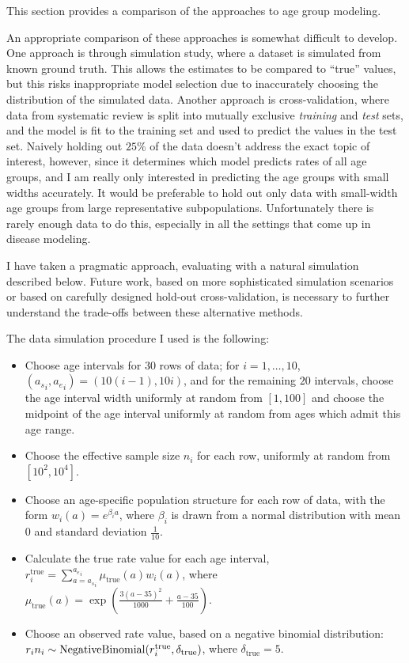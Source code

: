 This section provides a comparison of the approaches to age group
modeling.

An appropriate comparison of these approaches is somewhat difficult to
develop.  One approach is through simulation study, where a dataset is
simulated from known ground truth.  This allows the estimates to be
compared to ``true'' values, but this risks
inappropriate model selection due to inaccurately choosing the
distribution of the simulated data.  Another approach is
cross-validation, where data from systematic review is split into
mutually exclusive
\emph{training} and \emph{test} sets, and the model is fit to the
training set and used to predict the values in the test set.  Naively
holding out $25\%$ of the data doesn't address the exact topic of
interest, however, since it determines which model predicts rates of
all age groups, and I am really only interested in predicting the age
groups with small widths accurately.  It would be preferable to hold
out only data with small-width age groups from large representative
subpopulations.  Unfortunately there is rarely enough data to do this,
especially in all the settings that come up in disease modeling.

I have taken a pragmatic approach, evaluating with a natural
simulation described below.  Future work, based on more sophisticated
simulation scenarios or based on carefully designed hold-out
cross-validation, is necessary to further understand the trade-offs
between these alternative methods.

The data simulation procedure I used is the following:
\begin{itemize}
\item Choose age intervals for $30$ rows of data; for $i=1,\ldots,10$,
  $({a_s}_i,{a_e}_i) = (10(i-1), 10i)$, and for the remaining $20$
  intervals, choose the age interval width uniformly at random from $[1,100]$
  and choose the midpoint of the age interval uniformly at random from ages
  which admit this age range.

\item Choose the effective sample size $n_i$ for each row, uniformly at random from $[10^2, 10^4]$.

\item Choose an age-specific population structure for each row of data,
  with the form $w_i(a) = e^{\beta_i a}$, where $\beta_i$ is drawn
  from a normal distribution with mean $0$ and standard deviation
  $\frac{1}{10}$.

\item Calculate the true rate value for each age interval,
  $r^\text{true}_i = \sum_{a={a_s}_i}^{{a_e}_i} \mu_\text{true}(a)
  w_i(a)$, where $\mu_\text{true}(a) =
  \exp\left(\frac{3(a-35)^2}{1000} + \frac{a-35}{100}\right).$

\item Choose an observed rate value, based on a negative binomial distribution:
$r_in_i \sim \operatorname{NegativeBinomial}(r^\text{true}_i, \delta_\text{true})$, where $\delta_\text{true} = 5$.
\end{itemize}

